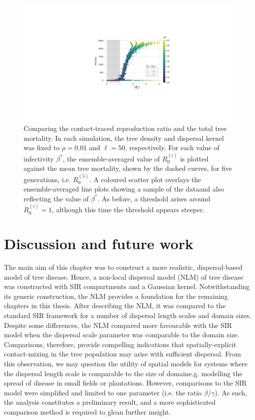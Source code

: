 \begin{figure}
    \centering
    \includegraphics[scale=0.6]{chapter5/figures/fig6-R0-contact-vs-mortality.pdf}
    \caption{Comparing the contact-traced reproduction ratio and the total tree mortality. 
    In each simulation, the tree density and dispersal kernel was fixed to $\rho=0.01$ and $\ell=50$, respectively. 
    For each value of infectivity $\beta^*$, the ensemble-averaged value of $R_0^{(i)}$ is plotted against the mean tree mortality, shown by the dashed curves, for five generations, i.e. $R_{0}^{(5)}$.
    A coloured scatter plot overlays the ensemble-averaged line plots showing a sample of the data\textemdash and also reflecting the value of $\beta^*$.
    As before, a threshold arises around $R_0^{(i)} = 1$, although this time the threshold appears steeper.}
    \label{fig:contact-trace-vs-mortality}
\end{figure}

\newpage
\section{Discussion and future work}

The main aim of this chapter was to construct a more realistic, dispersal-based model of tree disease.
Hence, a non-local dispersal model (NLM) of tree disease was constructed with SIR compartments and a Gaussian kernel.
Notwithstanding its generic construction, the NLM provides a foundation for the remaining chapters in this thesis.
After describing the NLM, it was compared to the standard SIR framework for a number of dispersal length scales and domain sizes.
Despite some differences, the NLM compared more favourable with the SIR model when the dispersal scale parameter was comparable to the domain size.
Comparisons, therefore, provide compelling indications that spatially-explicit contact-mixing in the tree population may arise with sufficient dispersal.
From this observation, we may question the utility of spatial models for systems where the dispersal length scale is comparable to the size of domain\textemdash e.g. modelling the spread of disease in small fields or plantations. However, comparisons to the SIR model were simplified and limited to one parameter (i.e. the ratio $\beta/\gamma$). As such, the analysis constitutes a preliminary result, and a more sophisticated comparison method is required to glean further insight.

